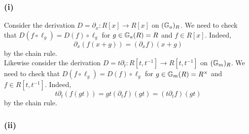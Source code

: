 \documentclass[12pt]{article}
\begin{document}
\subsubsection{(i)}

Consider the derivation $D = \partial_x : R[x] \to R[x]$ on $({\mathbb{G}_a})_R$. We need to check that $D(f \circ \ell_g) = D(f) \circ \ell_g$ for $g \in {\mathbb{G}_a}(R) = R$ and $f \in R[x]$. Indeed,
\[ \partial_x (f(x + g)) = (\partial_x f)(x + g) \]
by the chain rule.
\bigskip\\ 
Likewise consider the derivation $D = t \partial_t : R[t, t^{-1}] \to R[t,t^{-1}]$ on $({\mathbb{G}_m})_R$. We need to check that $D(f \circ \ell_g) = D(f) \circ \ell_g$ for $g \in {\mathbb{G}_m}(R) = R^\times$ and $f \in R[t,t^{-1}]$. Indeed,
\[ t \partial_t (f(gt)) = gt (\partial_t f)(gt) = (t \partial_t f)(gt)  \]
by the chain rule.

\subsubsection{(ii)}
\end{document}
